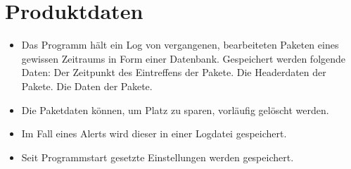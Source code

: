 \chapter{Produktdaten}


\begin{itemize}
  \item Das Programm hält ein Log von vergangenen, bearbeiteten Paketen eines gewissen Zeitraums in Form einer Datenbank. Gespeichert werden folgende Daten:
    \subitem Der Zeitpunkt des Eintreffens der Pakete.
    \subitem Die Headerdaten der Pakete.
    \subitem Die Daten der Pakete.
  \item Die Paketdaten können, um Platz zu sparen, vorläufig gelöscht werden.
  \item Im Fall eines Alerts wird dieser in einer Logdatei gespeichert.
  \item Seit Programmstart gesetzte Einstellungen werden gespeichert.
\end{itemize} 